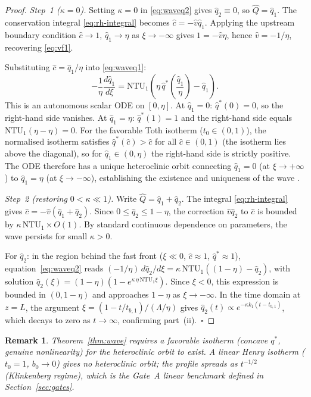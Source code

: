 \documentclass[a4paper]{amsart}
\newtheorem{remark}[theorem]{Remark}
\theoremstyle{definition}
\begin{document}
\begin{proof}
\textit{Step~1 ($\kappa=0$).}  Setting $\kappa=0$ in \eqref{eq:waveq2} gives
$\hat{q}_2\equiv0$, so $\hat{Q}=\hat{q}_1$.  The conservation integral
\eqref{eq:rh-integral} becomes $\hat{c}=-\hat{v}\hat{q}_1$.
Applying the upstream boundary condition
$\hat{c}\to1$, $\hat{q}_1\to\eta$ as $\xi\to-\infty$ gives
$1=-\hat{v}\eta$, hence $\hat{v}=-1/\eta$, recovering \eqref{eq:vf1}.

Substituting $\hat{c}=\hat{q}_1/\eta$ into \eqref{eq:waveq1}:
\[
  -\frac{1}{\eta}\frac{d\hat{q}_1}{d\xi}
    = \mathrm{NTU}_1\!\left(\eta\,\hat{q}^*\!\left(\frac{\hat{q}_1}{\eta}\right)
                              - \hat{q}_1\right).
\]
This is an autonomous scalar ODE on $[0,\eta]$.  At $\hat{q}_1=0$:
$\hat{q}^*(0)=0$, so the right-hand side vanishes.  At $\hat{q}_1=\eta$:
$\hat{q}^*(1)=1$ and the right-hand side equals $\mathrm{NTU}_1(\eta-\eta)=0$.
For the favorable Toth isotherm ($t_0\in(0,1)$), the normalised isotherm
satisfies $\hat{q}^*(\hat{c})>\hat{c}$ for all $\hat{c}\in(0,1)$
(the isotherm lies above the diagonal), so for $\hat{q}_1\in(0,\eta)$ the
right-hand side is strictly positive.  The ODE therefore has a unique
heteroclinic orbit connecting $\hat{q}_1=0$ (at $\xi\to+\infty$) to
$\hat{q}_1=\eta$ (at $\xi\to-\infty$), establishing the existence and
uniqueness of the wave \cite{Rhee1970}.

\textit{Step~2 (restoring $0<\kappa\ll1$).}
Write $\hat{Q}=\hat{q}_1+\hat{q}_2$.  The integral \eqref{eq:rh-integral}
gives $\hat{c}=-\hat{v}(\hat{q}_1+\hat{q}_2)$.  Since $0\leq\hat{q}_2\leq1-\eta$,
the correction $\hat{v}\hat{q}_2$ to $\hat{c}$ is bounded by
$\kappa\,\mathrm{NTU}_1\times O(1)$.  By standard continuous dependence on
parameters, the wave persists for small $\kappa>0$.

For $\hat{q}_2$: in the region behind the fast front ($\xi\ll0$, $\hat{c}\approx1$,
$\hat{q}^*\approx1$), equation~\eqref{eq:waveq2} reads
$(-1/\eta)\,d\hat{q}_2/d\xi=\kappa\,\mathrm{NTU}_1((1-\eta)-\hat{q}_2)$,
with solution $\hat{q}_2(\xi)=(1-\eta)(1-e^{\kappa\,\eta\,\mathrm{NTU}_1\xi})$.
Since $\xi<0$, this expression is bounded in $(0,1-\eta)$ and approaches
$1-\eta$ as $\xi\to-\infty$.  In the time domain at $z=L$, the
argument $\xi = (1 - t/t_{b,1})/(\Lambda/\eta)$ gives
$\hat{q}_2(t)\propto e^{-\kappa k_1(t-t_{b,1})}$, which decays to zero as
$t\to\infty$, confirming part~(ii).~$\square$
\end{proof}

\begin{remark}
  Theorem~\ref{thm:wave} requires a favorable isotherm (concave $q^*$,
  genuine nonlinearity) for the heteroclinic orbit to exist.  A linear Henry
  isotherm ($t_0=1$, $b_0\to0$) gives no heteroclinic orbit; the profile
  spreads as $t^{-1/2}$ (Klinkenberg regime), which is the Gate~A linear
  benchmark defined in Section~\ref{sec:gates}.
\end{remark}
\end{document}
